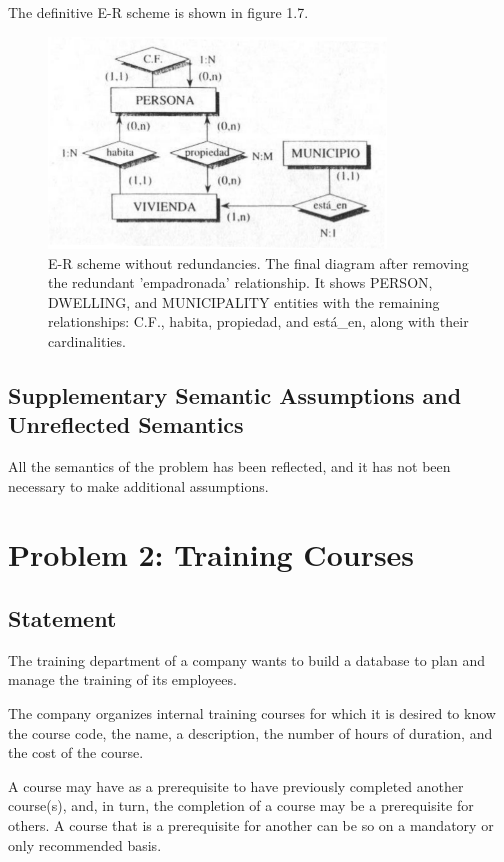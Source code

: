 \documentclass{article}
\numberwithin{figure}{section}
\begin{document}
The definitive E-R scheme is shown in figure 1.7.

\begin{figure}
    \centering
    \includegraphics[width=0.8\textwidth]{figures/fig7}
    \caption{E-R scheme without redundancies. The final diagram after removing the redundant 'empadronada' relationship. It shows PERSON, DWELLING, and MUNICIPALITY entities with the remaining relationships: C.F., habita, propiedad, and está\_en, along with their cardinalities.}
    \label{fig:fig1.7}
\end{figure}

\subsection*{
Supplementary Semantic Assumptions and Unreflected Semantics
}

All the semantics of the problem has been reflected, and it has not been necessary to make additional assumptions.

\section{Problem 2: Training Courses}

\subsection{Statement}

The training department of a company wants to build a database to plan and manage the training of its employees.

The company organizes internal training courses for which it is desired to know the course code, the name, a description, the number of hours of duration, and the cost of the course.

A course may have as a prerequisite to have previously completed another course(s), and, in turn, the completion of a course may be a prerequisite for others.  A course that is a prerequisite for another can be so on a mandatory or only recommended basis.
\end{document}
